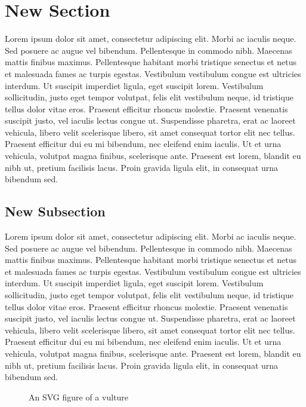 \documentclass[a4paper,man,donotrepeattitle,natbib]{apa6}
\begin{document}
\section{New Section}
 
Lorem ipsum dolor sit amet, consectetur adipiscing elit. Morbi ac iaculis neque. Sed posuere ac augue vel bibendum. Pellentesque in commodo nibh. Maecenas mattis finibus maximus. Pellentesque habitant morbi tristique senectus et netus et malesuada fames ac turpis egestas. Vestibulum vestibulum congue est ultricies interdum. Ut suscipit imperdiet ligula, eget suscipit lorem. Vestibulum sollicitudin, justo eget tempor volutpat, felis elit vestibulum neque, id tristique tellus dolor vitae eros. Praesent efficitur rhoncus molestie. Praesent venenatis suscipit justo, vel iaculis lectus congue ut. Suspendisse pharetra, erat ac laoreet vehicula, libero velit scelerisque libero, sit amet consequat tortor elit nec tellus. Praesent efficitur dui eu mi bibendum, nec eleifend enim iaculis. Ut et urna vehicula, volutpat magna finibus, scelerisque ante. Praesent est lorem, blandit eu nibh ut, pretium facilisis lacus. Proin gravida ligula elit, in consequat urna bibendum sed.

\subsection{New Subsection} 

Lorem ipsum dolor sit amet, consectetur adipiscing elit. Morbi ac iaculis neque. Sed posuere ac augue vel bibendum. Pellentesque in commodo nibh. Maecenas mattis finibus maximus. Pellentesque habitant morbi tristique senectus et netus et malesuada fames ac turpis egestas. Vestibulum vestibulum congue est ultricies interdum. Ut suscipit imperdiet ligula, eget suscipit lorem. Vestibulum sollicitudin, justo eget tempor volutpat, felis elit vestibulum neque, id tristique tellus dolor vitae eros. Praesent efficitur rhoncus molestie. Praesent venenatis suscipit justo, vel iaculis lectus congue ut. Suspendisse pharetra, erat ac laoreet vehicula, libero velit scelerisque libero, sit amet consequat tortor elit nec tellus. Praesent efficitur dui eu mi bibendum, nec eleifend enim iaculis. Ut et urna vehicula, volutpat magna finibus, scelerisque ante. Praesent est lorem, blandit eu nibh ut, pretium facilisis lacus. Proin gravida ligula elit, in consequat urna bibendum sed.

\begin{figure}[htbp]
    \centering
    
    \caption{An SVG figure of a vulture}
    \label{fig:vulture}
\end{figure}
\end{document}
